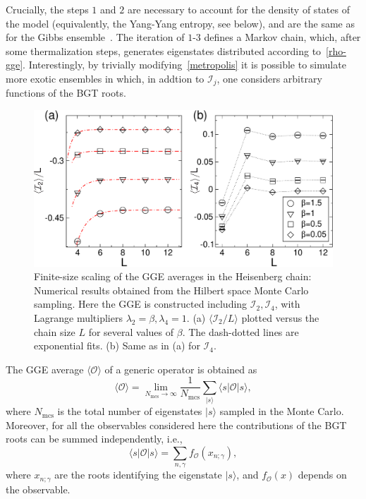 \documentclass[twocolumn,superscriptaddress,prb,10pt]{revtex4-1}
\begin{document}
Crucially, the steps $1$ and $2$ are necessary to account for the density of states of the model 
(equivalently, the Yang-Yang entropy, see below), 
and are the same as for the Gibbs ensemble~\cite{gu-2005}. The iteration of $1$-$3$ defines a Markov 
chain, which, after some thermalization steps, generates eigenstates distributed according 
to~\eqref{rho-gge}. Interestingly, by trivially modifying~\eqref{metropolis} it is possible to 
simulate more exotic ensembles in which, in addtion to ${\mathcal I}_j$, one considers 
arbitrary functions of the BGT roots.  
%
\begin{figure}[t]
\includegraphics*[width=0.93\linewidth]{./draft_figs/fig3}
\caption{Finite-size scaling of the GGE averages in the Heisenberg chain: Numerical results 
 obtained from the Hilbert space Monte Carlo sampling. Here the GGE is constructed including 
 ${\mathcal I}_2,{\mathcal I}_4$, with Lagrange multipliers $\lambda_2=\beta,
 \lambda_4=1$. (a) $\langle {\mathcal I}_2/L\rangle$ plotted versus the chain size 
 $L$ for several values of $\beta$. The dash-dotted lines are exponential fits. (b) Same as 
 in (a) for ${\mathcal I}_4$.
}
\label{fig2}
\end{figure}
%
The GGE average $\langle{\mathcal O}\rangle$ of a generic operator is obtained as  
%
\begin{equation}
\label{gge-mc}
\langle{\mathcal O}\rangle=\lim\limits_{N_\textrm{mcs}\to\infty}\frac{1}
{N_\textrm{mcs}}\sum\limits_{|s\rangle}\langle s|{\mathcal O}
|s\rangle,
\end{equation}
%
where $N_{\textrm{mcs}}$ is the total number of eigenstates $|s\rangle$ sampled in 
the Monte Carlo. Moreover, for all the observables considered here the contributions 
of the BGT roots can be summed independently, i.e., 
%
\begin{equation}
\label{gge-mc-1}
\langle s|{\mathcal O}|s\rangle=\sum\limits_{n,\gamma}f_{{\mathcal O}}(x_{n;\gamma}), 
\end{equation}
%
where $x_{n;\gamma}$ are the roots identifying the eigenstate $|s\rangle$, and 
$f_{{\mathcal O}}(x)$ depends on the observable. 
\end{document}

